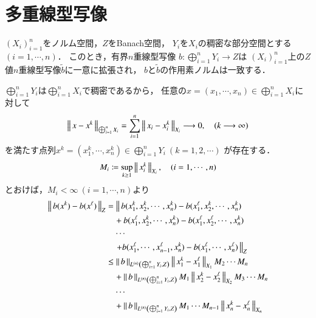 \section{多重線型写像}
	
	\begin{screen}
		\begin{thm}[多重線型写像の一意拡張]
			$(X_i)_{i=1}^{n}$をノルム空間，$Z$をBanach空間，
			$Y_i$を$X_i$の稠密な部分空間とする$(i=1,\cdots,n)$．
			このとき，有界$n$重線型写像
			$b:\bigoplus_{i=1}^n Y_i \longrightarrow Z$は
			$(X_i)_{i=1}^{n}$上の$Z$値$n$重線型写像$\tilde{b}$に一意に拡張され，
			$b$と$\tilde{b}$の作用素ノルムは一致する．
		\end{thm}
	\end{screen}
	
	\begin{prf}
		$\bigoplus_{i=1}^n Y_i$は$\bigoplus_{i=1}^n X_i$で稠密であるから，
		任意の$x = (x_1,\cdots,x_n) \in \bigoplus_{i=1}^n X_i$に対して
		\begin{align}
			\left\|\, x - x^k\, \right\|_{\bigoplus_{i=1}^n X_i}
			= \sum_{i=1}^n \left\|\, x_i - x^k_i\, \right\|_{X_i} \longrightarrow 0,
			\quad (k \longrightarrow \infty)
		\end{align}
		を満たす点列$x^k = (x^k_1,\cdots,x^k_n) \in \bigoplus_{i=1}^n Y_i\ (k=1,2,\cdots)$
		が存在する．
		\begin{align}
			M_i \coloneqq \operatorname*{sup}_{k \geq 1} \left\|\, x^k_i\, \right\|_{X_i},
			\quad (i=1,\cdots,n)
		\end{align}
		とおけば，$M_i < \infty\ (i=1,\cdots,n)$より
		\begin{align}
			\Norm{b(x^k) - b(x^\ell)}{Z}
			&= \left\|\, b(x^k_1,x^k_2,\cdots,x^k_n) - b(x^\ell_1,x^k_2,\cdots,x^k_n) \right. \\
				&\quad + b(x^\ell_1,x^k_2,\cdots,x^k_n) - b(x^\ell_1,x^\ell_2,\cdots,x^k_n) \\
				&\quad \cdots \\
				&\quad \left. + b(x^\ell_1,\cdots,x^\ell_{n-1},x^k_n) - b(x^\ell_1,\cdots,x^\ell_n)\,  \right\|_Z \\
			&\leq \Norm{b}{\ContLn{\bigoplus_{i=1}^n Y_i}{Z}{n}} \Norm{x^k_1 - x^\ell_1}{X_1} M_2 \cdots M_n \\
			&\quad + \Norm{b}{\ContLn{\bigoplus_{i=1}^n Y_i}{Z}{n}} M_1 \Norm{x^k_2 - x^\ell_2}{X_2} M_3 \cdots M_n \\
			&\quad \cdots \\
			&\quad + \Norm{b}{\ContLn{\bigoplus_{i=1}^n Y_i}{Z}{n}} M_1 \cdots M_{n-1} \Norm{x^k_n - x^\ell_n}{X_n} \\

\end{align}
\end{prf}
